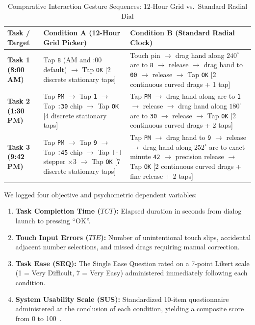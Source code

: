\documentclass[11pt,a4paper]{article}
\begin{document}
\begin{table}[htbp]
\centering
\small
\caption{Comparative Interaction Gesture Sequences: 12-Hour Grid vs.\ Standard Radial Dial}
\label{tab:interaction_sequences}
\begin{tabularx}{\linewidth}{lXX}
\toprule
\textbf{Task / Target} & \textbf{Condition A (12-Hour Grid Picker)} & \textbf{Condition B (Standard Radial Clock)} \\
\midrule
\textbf{Task 1 (8:00 AM)} & Tap \texttt{8} (AM and :00 default) $\to$ Tap \texttt{OK} [2 discrete stationary taps] & Touch pin $\to$ drag hand along $240^\circ$ arc to \texttt{8} $\to$ release $\to$ drag hand to \texttt{00} $\to$ release $\to$ Tap \texttt{OK} [2 continuous curved drags + 1 tap] \\
\addlinespace
\textbf{Task 2 (1:30 PM)} & Tap \texttt{PM} $\to$ Tap \texttt{1} $\to$ Tap \texttt{:30} chip $\to$ Tap \texttt{OK} [4 discrete stationary taps] & Tap \texttt{PM} $\to$ drag hand along arc to \texttt{1} $\to$ release $\to$ drag hand along $180^\circ$ arc to \texttt{30} $\to$ release $\to$ Tap \texttt{OK} [2 continuous curved drags + 2 taps] \\
\addlinespace
\textbf{Task 3 (9:42 PM)} & Tap \texttt{PM} $\to$ Tap \texttt{9} $\to$ Tap \texttt{:45} chip $\to$ Tap \texttt{[-]} stepper $\times 3$ $\to$ Tap \texttt{OK} [7 discrete stationary taps] & Tap \texttt{PM} $\to$ drag hand to \texttt{9} $\to$ release $\to$ drag hand along $252^\circ$ arc to exact minute \texttt{42} $\to$ precision release $\to$ Tap \texttt{OK} [2 continuous curved drags + fine release + 2 taps] \\
\bottomrule
\end{tabularx}
\end{table}

We logged four objective and psychometric dependent variables:
\begin{enumerate}
    \item \textbf{Task Completion Time ($TCT$):} Elapsed duration in seconds from dialog launch to pressing ``OK''.
    \item \textbf{Touch Input Errors ($TIE$):} Number of unintentional touch slips, accidental adjacent number selections, and missed drags requiring manual correction.
    \item \textbf{Task Ease (SEQ):} The Single Ease Question rated on a 7-point Likert scale (1 = Very Difficult, 7 = Very Easy) administered immediately following each condition.
    \item \textbf{System Usability Scale (SUS):} Standardized 10-item questionnaire administered at the conclusion of each condition, yielding a composite score from 0 to 100~\cite{brooke1996sus}.
\end{enumerate}
\end{document}
